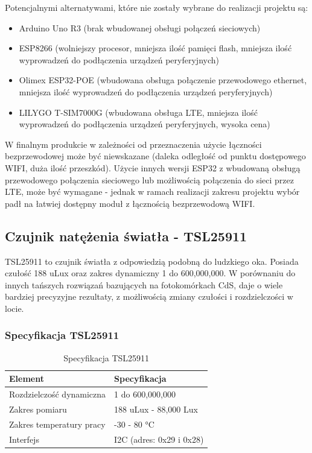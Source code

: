 \documentclass[12pt,a4paper]{article}
\begin{document}
\noindent Potencjalnymi alternatywami, które nie zostały wybrane do realizacji projektu są:
\begin{itemize}
    \item Arduino Uno R3 (brak wbudowanej obsługi połączeń sieciowych)
    \item ESP8266 (wolniejszy procesor, mniejsza ilość pamięci flash, mniejsza ilość wyprowadzeń do podłączenia urządzeń peryferyjnych)
    \item Olimex ESP32-POE\cite{olimex-esp32poe} (wbudowana obsługa połączenie przewodowego ethernet, mniejsza ilość wyprowadzeń do podłączenia urządzeń peryferyjnych)
    \item LILYGO T-SIM7000G\cite{lilygo-esp32lte} (wbudowana obsługa LTE, mniejsza ilość wyprowadzeń do podłączenia urządzeń peryferyjnych, wysoka cena)
\end{itemize}

\noindent W finalnym produkcie w zależności od przeznaczenia użycie łączności bezprzewodowej może być niewskazane (daleka odległość od punktu dostępowego WIFI, duża ilość przeszkód).
Użycie innych wersji ESP32 z wbudowaną obsługą przewodowego połączenia sieciowego lub możliwością połączenia do sieci przez LTE, może być wymagane - jednak
w ramach realizacji zakresu projektu wybór padł na łatwiej dostępny moduł z łącznością bezprzewodową WIFI.  

\subsection{Czujnik natężenia światła - TSL25911}

TSL25911 to czujnik światła z odpowiedzią podobną do ludzkiego oka. Posiada czułość 188 uLux oraz zakres dynamiczny 1 do 600,000,000.
W porównaniu do innych tańszych rozwiązań bazujących na fotokomórkach CdS, daje o wiele bardziej precyzyjne rezultaty, z możliwością zmiany czułości i
rozdzielczości w locie. 

\subsubsection{Specyfikacja TSL25911}
\begin{table}[H]
    \centering
    \begin{tabular}{|l|l|}
        \hline
        Element & Specyfikacja \\
        \hline
        Rozdzielczość dynamiczna & 1 do 600,000,000 \\
        \hline
        Zakres pomiaru & 188 uLux - 88,000 Lux \\
        \hline
        Zakres temperatury pracy & -30 - 80 °C \\
        \hline
        Interfejs & I2C (adres: 0x29 i 0x28)\\
        \hline
    \end{tabular}
    \caption{Specyfikacja TSL25911}
    \label{tsl25911-spec}
\end{table}
\end{document}
